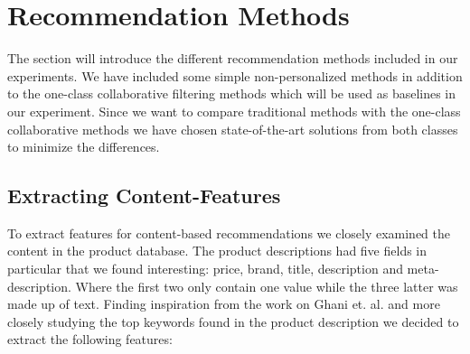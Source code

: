 
\section{Recommendation Methods}
\label{sec:rec-models}

The section will introduce the different recommendation methods included in our
experiments. We have included some simple non-personalized methods in addition
to the one-class collaborative filtering methods which will be used as baselines in
our experiment. Since we want to compare traditional methods with the one-class
collaborative methods we have chosen state-of-the-art solutions from both classes
to minimize the differences.




\subsection{Extracting Content-Features}


To extract features for content-based recommendations we closely examined the content in the product database.
The product descriptions had five fields in particular that we found interesting: price, brand, title, description
and meta-description. Where the first two only contain one value while the three
latter was made up of text.
Finding inspiration from the work on Ghani et. al. \cite{ghani2002building} and more closely studying the top keywords
found in the product description we decided to extract the following features:

